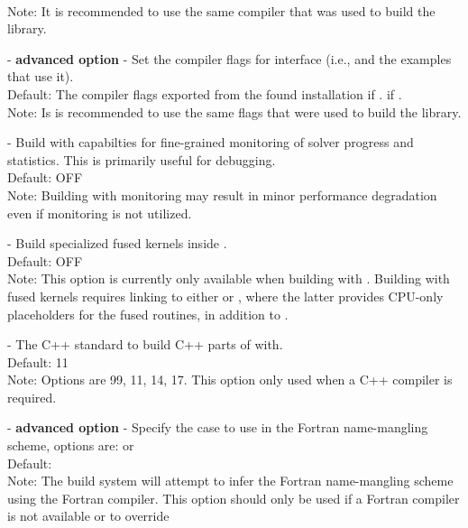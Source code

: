 \begin{description}
  \\
  Note: It is recommended to use the same compiler that was used to build the {\trilinos} library.
\item[\id{TRILINOS\_INTERFACE\_CXX\_COMPILER\_FLAGS}] - \textbf{advanced option} -
  Set the {\CPP} compiler flags for {\trilinos} interface
  (i.e., {\nvectrilinos} and the examples that use it).
  \\
  Default: The {\CPP} compiler flags exported from the found {\trilinos} installation
  if .  if .
  \\
  Note: Is is recommended to use the same flags that were used to build the {\trilinos} library.
\item[\id{SUNDIALS\_BUILD\_WITH\_MONITORING}] -
  Build {\sundials} with capabilties for fine-grained monitoring of solver progress
  and statistics. This is primarily useful for debugging.
  \\
  Default: OFF
  \\
  Note: Building with monitoring may result in minor performance degradation
  even if monitoring is not utilized.
\item[\id{SUNDIALS\_BUILD\_PACKAGE\_FUSED\_KERNELS}] -
  Build specialized fused kernels inside {\cvode}.
  \\
  Default: OFF
  \\
  Note: This option is currently only available when building with
  . Building with fused kernels requires
  linking to either  or
  , where the latter
  provides CPU-only placeholders for the fused routines, in
  addition to .
\item[\id{CMAKE\_CXX\_STANDARD}] -
  The C++ standard to build C++ parts of {\sundials} with.
  \\
  Default: 11
  \\
  Note: Options are 99, 11, 14, 17. This option only used when a
  C++ compiler is required.
\item[\id{SUNDIALS\_F77\_FUNC\_CASE}] - \textbf{advanced option} -
  Specify the case to use in the Fortran name-mangling scheme, options
  are:  or 
  \\
  Default:
  \\
  Note: The build system will attempt to infer the Fortran
  name-mangling scheme using the Fortran compiler. This option should
  only be used if a Fortran compiler is not available or to override

\end{description}
